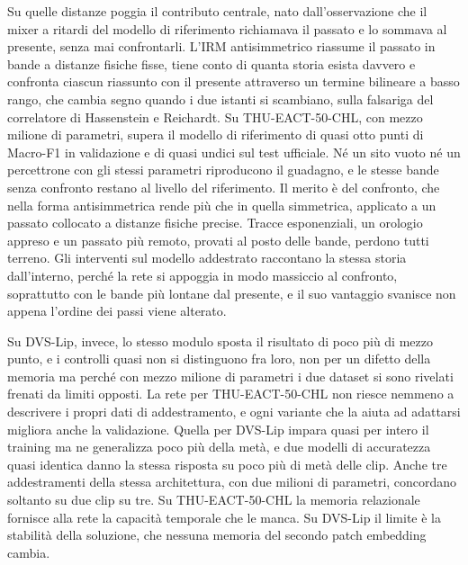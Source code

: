 Su quelle distanze poggia il contributo centrale, nato dall'osservazione che il mixer a ritardi del modello di riferimento richiamava il passato e lo sommava al presente, senza mai confrontarli. L'IRM antisimmetrico riassume il passato in bande a distanze fisiche fisse, tiene conto di quanta storia esista davvero e confronta ciascun riassunto con il presente attraverso un termine bilineare a basso rango, che cambia segno quando i due istanti si scambiano, sulla falsariga del correlatore di Hassenstein e Reichardt. Su THU-EACT-50-CHL, con mezzo milione di parametri, supera il modello di riferimento di quasi otto punti di Macro-F1 in validazione e di quasi undici sul test ufficiale. Né un sito vuoto né un percettrone con gli stessi parametri riproducono il guadagno, e le stesse bande senza confronto restano al livello del riferimento. Il merito è del confronto, che nella forma antisimmetrica rende più che in quella simmetrica, applicato a un passato collocato a distanze fisiche precise. Tracce esponenziali, un orologio appreso e un passato più remoto, provati al posto delle bande, perdono tutti terreno. Gli interventi sul modello addestrato raccontano la stessa storia dall'interno, perché la rete si appoggia in modo massiccio al confronto, soprattutto con le bande più lontane dal presente, e il suo vantaggio svanisce non appena l'ordine dei passi viene alterato.

Su DVS-Lip, invece, lo stesso modulo sposta il risultato di poco più di mezzo punto, e i controlli quasi non si distinguono fra loro, non per un difetto della memoria ma perché con mezzo milione di parametri i due dataset si sono rivelati frenati da limiti opposti. La rete per THU-EACT-50-CHL non riesce nemmeno a descrivere i propri dati di addestramento, e ogni variante che la aiuta ad adattarsi migliora anche la validazione. Quella per DVS-Lip impara quasi per intero il training ma ne generalizza poco più della metà, e due modelli di accuratezza quasi identica danno la stessa risposta su poco più di metà delle clip. Anche tre addestramenti della stessa architettura, con due milioni di parametri, concordano soltanto su due clip su tre. Su THU-EACT-50-CHL la memoria relazionale fornisce alla rete la capacità temporale che le manca. Su DVS-Lip il limite è la stabilità della soluzione, che nessuna memoria del secondo patch embedding cambia.

